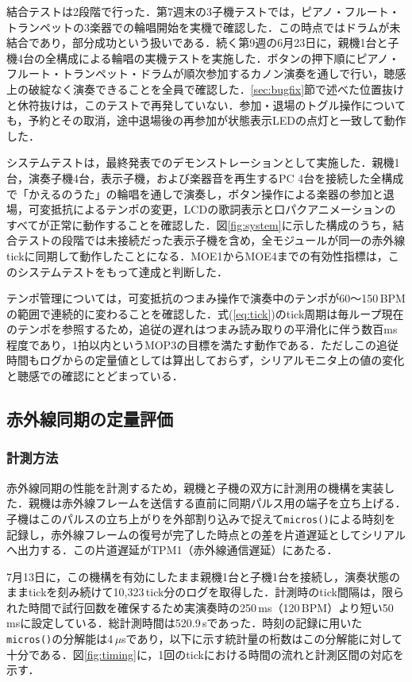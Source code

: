 \documentclass[uplatex,dvipdfmx]{jlreq}
\begin{document}
結合テストは2段階で行った．第7週末の3子機テストでは，ピアノ・フルート・トランペットの3楽器での輪唱開始を実機で確認した．この時点ではドラムが未結合であり，部分成功という扱いである．続く第9週の6月23日に，親機1台と子機4台の全構成による輪唱の実機テストを実施した．ボタンの押下順にピアノ・フルート・トランペット・ドラムが順次参加するカノン演奏を通しで行い，聴感上の破綻なく演奏できることを全員で確認した．\ref{sec:bugfix}節で述べた位置抜けと休符抜けは，このテストで再発していない．参加・退場のトグル操作についても，予約とその取消，途中退場後の再参加が状態表示LEDの点灯と一致して動作した．

システムテストは，最終発表でのデモンストレーションとして実施した．親機1台，演奏子機4台，表示子機，および楽器音を再生するPC 4台を接続した全構成で「かえるのうた」の輪唱を通しで演奏し，ボタン操作による楽器の参加と退場，可変抵抗によるテンポの変更，LCDの歌詞表示と口パクアニメーションのすべてが正常に動作することを確認した．図\ref{fig:system}に示した構成のうち，結合テストの段階では未接続だった表示子機を含め，全モジュールが同一の赤外線tickに同期して動作したことになる．MOE1からMOE4までの有効性指標は，このシステムテストをもって達成と判断した．

テンポ管理については，可変抵抗のつまみ操作で演奏中のテンポが60〜150\,BPMの範囲で連続的に変わることを確認した．式(\ref{eq:tick})のtick周期は毎ループ現在のテンポを参照するため，追従の遅れはつまみ読み取りの平滑化に伴う数百ms程度であり，1拍以内というMOP3の目標を満たす動作である．ただしこの追従時間もログからの定量値としては算出しておらず，シリアルモニタ上の値の変化と聴感での確認にとどまっている．

\subsection{赤外線同期の定量評価}
\label{sec:eval-latency}

\subsubsection{計測方法}

赤外線同期の性能を計測するため，親機と子機の双方に計測用の機構を実装した．親機は赤外線フレームを送信する直前に同期パルス用の端子を立ち上げる．子機はこのパルスの立ち上がりを外部割り込みで捉えて\texttt{micros()}による時刻を記録し，赤外線フレームの復号が完了した時点との差を片道遅延としてシリアルへ出力する．この片道遅延がTPM1（赤外線通信遅延）にあたる．

7月13日に，この機構を有効にしたまま親機1台と子機1台を接続し，演奏状態のままtickを刻み続けて10{,}323\,tick分のログを取得した．計測時のtick間隔は，限られた時間で試行回数を確保するため実演奏時の250\,ms（120\,BPM）より短い50\,msに設定している．総計測時間は520.9\,sであった．時刻の記録に用いた\texttt{micros()}の分解能は4\,$\mu$sであり，以下に示す統計量の桁数はこの分解能に対して十分である．図\ref{fig:timing}に，1回のtickにおける時間の流れと計測区間の対応を示す．
\end{document}
